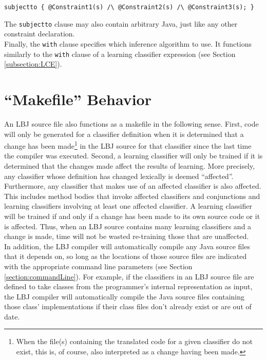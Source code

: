 \vspace{-.25cm}
{\tt subjectto
     \{ \verb|@Constraint1(s) /\ @Constraint2(s) /\ @Constraint3(s);| \}} \\
\vspace{-.25cm}

\noindent
The {\tt subjectto} clause may also contain arbitrary Java, just like any
other constraint declaration. \\

Finally, the {\tt with} clause specifies which inference algorithm to use.  It
functions similarly to the {\tt with} clause of a learning classifier
expression (see Section \ref{subsection:LCE}).

\section{``Makefile'' Behavior}

An LBJ source file also functions as a makefile in the following sense.
First, code will only be generated for a classifier definition when it is
determined that a change has been made\footnote{When the file(s) containing
the translated code for a given classifier do not exist, this is, of course,
also interpreted as a change having been made.} in the LBJ source for that
classifier since the last time the compiler was executed.  Second, a learning
classifier will only be trained if it is determined that the changes made
affect the results of learning.  More precisely, any classifier whose
definition has changed lexically is deemed ``affected''.  Furthermore, any
classifier that makes use of an affected classifier is also affected.  This
includes method bodies that invoke affected classifiers and conjunctions and
learning classifiers involving at least one affected classifier.  A learning
classifier will be trained if and only if a change has been made to its own
source code or it is affected.  Thus, when an LBJ source contains many
learning classifiers and a change is made, time will not be wasted re-training
those that are unaffected. \\

In addition, the LBJ compiler will automatically compile any Java source files
that it depends on, so long as the locations of those source files are
indicated with the appropriate command line parameters (see Section
\ref{section:commandLine}).  For example, if the classifiers in an LBJ source
file are defined to take classes from the programmer's internal representation
as input, the LBJ compiler will automatically compile the Java source files
containing those class' implementations if their class files don't already
exist or are out of date.

